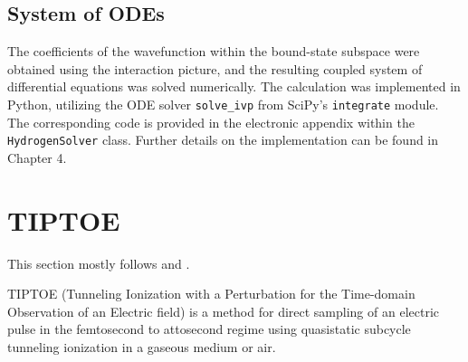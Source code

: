 



\subsection{System of ODEs}
The coefficients of the wavefunction within the bound-state subspace were obtained using the interaction picture, and the resulting coupled system of differential equations was solved numerically.
The calculation was implemented in Python, utilizing the ODE solver \texttt{solve\_ivp} from SciPy’s \texttt{integrate} module.
The corresponding code is provided in the electronic appendix within the \texttt{HydrogenSolver} class.
Further details on the implementation can be found in Chapter 4.




\section{TIPTOE}
This section mostly follows \cite{Park:18} and \cite{manorammasterthesis}.

TIPTOE (Tunneling Ionization with a Perturbation for the Time-domain Observation of an Electric field) is a method for direct sampling of an electric pulse in the femtosecond to attosecond regime using quasistatic subcycle tunneling ionization in a gaseous medium or air.


